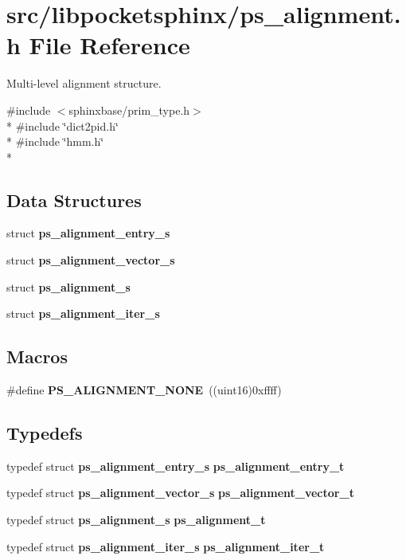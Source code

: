 \section{src/libpocketsphinx/ps\+\_\+alignment.h File Reference}
\label{ps__alignment_8h}


Multi-\/level alignment structure.  


{\ttfamily \#include $<$sphinxbase/prim\+\_\+type.\+h$>$}\\*
{\ttfamily \#include \char`\"{}dict2pid.\+h\char`\"{}}\\*
{\ttfamily \#include \char`\"{}hmm.\+h\char`\"{}}\\*
\subsection*{Data Structures}
\begin{DoxyCompactItemize}
\item 
struct {\bf ps\+\_\+alignment\+\_\+entry\+\_\+s}
\item 
struct {\bf ps\+\_\+alignment\+\_\+vector\+\_\+s}
\item 
struct {\bf ps\+\_\+alignment\+\_\+s}
\item 
struct {\bf ps\+\_\+alignment\+\_\+iter\+\_\+s}
\end{DoxyCompactItemize}
\subsection*{Macros}
\begin{DoxyCompactItemize}
\item 
\#define {\bfseries P\+S\+\_\+\+A\+L\+I\+G\+N\+M\+E\+N\+T\+\_\+\+N\+O\+N\+E}~((uint16)0xffff)\label{ps__alignment_8h_aa6ddcfcd7598f1b50582dd5489e63e50}

\end{DoxyCompactItemize}
\subsection*{Typedefs}
\begin{DoxyCompactItemize}
\item 
typedef struct {\bf ps\+\_\+alignment\+\_\+entry\+\_\+s} {\bfseries ps\+\_\+alignment\+\_\+entry\+\_\+t}\label{ps__alignment_8h_abf89e73906a29024da48581f645e3c98}

\item 
typedef struct {\bf ps\+\_\+alignment\+\_\+vector\+\_\+s} {\bfseries ps\+\_\+alignment\+\_\+vector\+\_\+t}\label{ps__alignment_8h_a57f06576e882630108c834e1a53a46d7}

\item 
typedef struct {\bf ps\+\_\+alignment\+\_\+s} {\bfseries ps\+\_\+alignment\+\_\+t}\label{ps__alignment_8h_a62983def0c01226bda91e6794a7f61f1}

\item 
typedef struct {\bf ps\+\_\+alignment\+\_\+iter\+\_\+s} {\bfseries ps\+\_\+alignment\+\_\+iter\+\_\+t}\label{ps__alignment_8h_afe48426a7d6bd0d7af628c4efc877ad8}

\end{DoxyCompactItemize}
